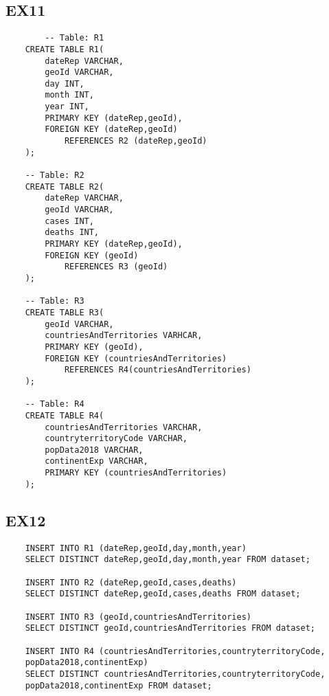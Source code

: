 \documentclass[12pt]{extarticle}
\begin{document}
    \subsection{EX11}
    \lstset{language=SQL}
    \begin{lstlisting}
        -- Table: R1
    CREATE TABLE R1(
        dateRep VARCHAR,
        geoId VARCHAR,
        day INT,
        month INT,
        year INT,
        PRIMARY KEY (dateRep,geoId),
        FOREIGN KEY (dateRep,geoId)
            REFERENCES R2 (dateRep,geoId)
    );
    
    -- Table: R2
    CREATE TABLE R2(
        dateRep VARCHAR,
        geoId VARCHAR,
        cases INT,
        deaths INT,
        PRIMARY KEY (dateRep,geoId),
        FOREIGN KEY (geoId)
            REFERENCES R3 (geoId)
    );
    
    -- Table: R3
    CREATE TABLE R3(
        geoId VARCHAR,
        countriesAndTerritories VARHCAR,
        PRIMARY KEY (geoId),
        FOREIGN KEY (countriesAndTerritories)
            REFERENCES R4(countriesAndTerritories)
    );
    
    -- Table: R4
    CREATE TABLE R4(
        countriesAndTerritories VARCHAR,
        countryterritoryCode VARCHAR,
        popData2018 VARCHAR,
        continentExp VARCHAR,
        PRIMARY KEY (countriesAndTerritories)
    );
    \end{lstlisting}
    \vspace{1.6cm}
    \subsection{EX12}
    \lstset{language=SQL}
    \begin{lstlisting}
    INSERT INTO R1 (dateRep,geoId,day,month,year)
    SELECT DISTINCT dateRep,geoId,day,month,year FROM dataset;
    
    INSERT INTO R2 (dateRep,geoId,cases,deaths)
    SELECT DISTINCT dateRep,geoId,cases,deaths FROM dataset;
    
    INSERT INTO R3 (geoId,countriesAndTerritories)
    SELECT DISTINCT geoId,countriesAndTerritories FROM dataset;
    
    INSERT INTO R4 (countriesAndTerritories,countryterritoryCode,
    popData2018,continentExp)
    SELECT DISTINCT countriesAndTerritories,countryterritoryCode,
    popData2018,continentExp FROM dataset;
    \end{lstlisting}
    
    \vspace{0.4cm}
\end{document}
